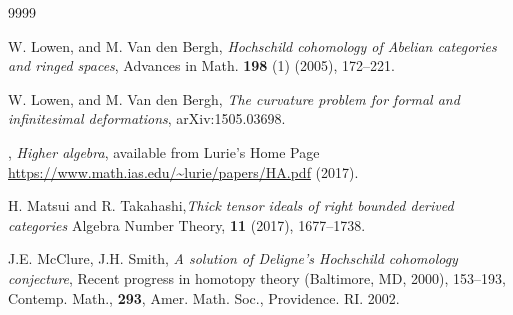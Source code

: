 \documentclass[a4paper, 11pt]{amsart}
\theoremstyle{definition}
\theoremstyle{remark}
\numberwithin{equation}{section}
\newcommand{\Ext}{\mathrm{Ext}}
\begin{document}
\begin{thebibliography}{9999}


 {\sc W. Lowen, and M. Van den Bergh}, {\em Hochschild cohomology of Abelian categories and ringed spaces}, Advances in Math. {\bf 198} (1) (2005), 172--221. 

 {\sc W. Lowen, and M. Van den Bergh}, {\em The curvature problem for formal and infinitesimal deformations}, arXiv:1505.03698.



, {\em Higher algebra}, available from Lurie's Home Page  \url{https://www.math.ias.edu/~lurie/papers/HA.pdf} (2017).





 {\sc H. Matsui and R. Takahashi},{\em Thick tensor ideals of right bounded derived categories} Algebra Number Theory, {\bf 11}  (2017), 1677–1738.

 {\sc J.E. McClure, J.H. Smith}, {\em A solution of Deligne's Hochschild cohomology conjecture}, Recent progress in homotopy theory (Baltimore, MD, 2000), 153--193, Contemp. Math., {\bf 293}, Amer. Math. Soc., Providence. RI. 2002. 




\end{thebibliography}
\end{document}

